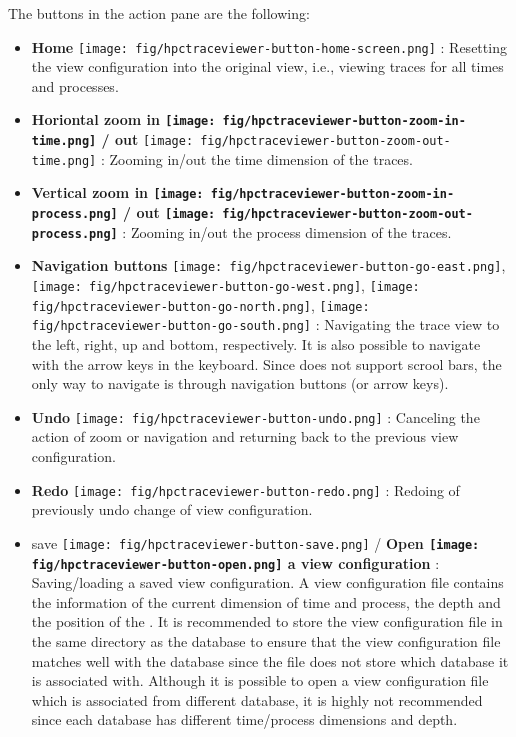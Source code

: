 The buttons in the action pane are the following:
\begin{itemize}

\item \textbf{Home} \texttt{[image: fig/hpctraceviewer-button-home-screen.png]} : Resetting the view configuration into the original view, i.e., viewing traces for all times and processes.
\item \textbf{Horiontal zoom in \texttt{[image: fig/hpctraceviewer-button-zoom-in-time.png]} / out }\texttt{[image: fig/hpctraceviewer-button-zoom-out-time.png]} : Zooming in/out the time dimension of the traces. 
\item \textbf{Vertical zoom in \texttt{[image: fig/hpctraceviewer-button-zoom-in-process.png]} / out \texttt{[image: fig/hpctraceviewer-button-zoom-out-process.png]} }: Zooming in/out the process dimension of the traces.
\item \textbf{Navigation buttons} \texttt{[image: fig/hpctraceviewer-button-go-east.png]}, \texttt{[image: fig/hpctraceviewer-button-go-west.png]}, \texttt{[image: fig/hpctraceviewer-button-go-north.png]}, \texttt{[image: fig/hpctraceviewer-button-go-south.png]} : Navigating the trace view to the left, right, up and bottom, respectively. It is also possible to navigate with the arrow keys in the keyboard. Since \traceview{} does not support scrool bars, the only way to navigate is through navigation buttons (or arrow keys).
\item \textbf{Undo} \texttt{[image: fig/hpctraceviewer-button-undo.png]} : Canceling the action of zoom or navigation and returning back to the previous view configuration.
\item \textbf{Redo} \texttt{[image: fig/hpctraceviewer-button-redo.png]} : Redoing of previously undo change of view configuration.
\item save \texttt{[image: fig/hpctraceviewer-button-save.png]}  / \textbf{Open \texttt{[image: fig/hpctraceviewer-button-open.png]} a view configuration} : Saving/loading a saved view configuration. 
A view configuration file contains the information of the current dimension of time and process, the depth and the position of the \crosshair{}. 
It is recommended to store the view configuration file in the same directory as the database to ensure that the view configuration file matches well with the database since the file does not store which database it is associated with. 
Although it is possible to open a view configuration file which is associated from different database, it is highly not recommended since each database has different time/process dimensions and depth.


\end{itemize}

